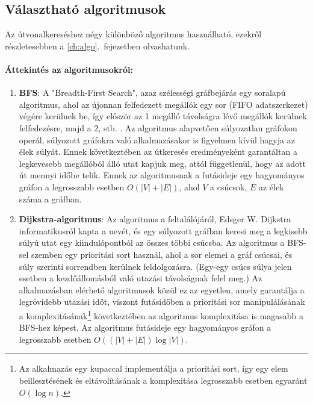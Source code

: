\subsection{Választható algoritmusok}

Az útvonalkereséshez négy különböző algoritmus használható, ezekről részletesebben a \ref{ch:algo}.~fejezetben olvashatunk.

\paragraph{Áttekintés az algoritmusokról:}
\begin{enumerate}
	\item \textbf{BFS}: A "Breadth-First Search", azaz szélességi gráfbejárás egy soralapú algoritmus, ahol az újonnan felfedezett megállók egy sor (FIFO adatszerkezet) végére kerülnek be, így először az 1 megálló távolságra lévő megállók kerülnek felfedezésre, majd a 2, stb. . Az algoritmus alapvetően súlyozatlan gráfokon operál, súlyozott gráfokra való alkalmazásakor is figyelmen kívül hagyja az élek súlyát. Ennek következtében az útkeresés eredményeként garantáltan a legkevesebb megállóból álló utat kapjuk meg, attól függetlenül, hogy az adott út mennyi időbe telik. Ennek az algoritmusnak a futásideje egy hagyományos gráfon a legrosszabb esetben $O(|V| + |E|)$, ahol $V$ a csúcsok, $E$ az élek száma a gráfban.
	\item \textbf{Dijkstra-algoritmus}: Az algoritmus a feltalálójáról, Edsger W. Dijkstra informatikusról kapta a nevét, és egy súlyozott gráfban keresi meg a legkisebb súlyú utat egy kiindulópontból az összes többi csúcsba. Az algoritmus a BFS-sel szemben egy prioritási sort használ, ahol a sor elemei a gráf csúcsai, és súly szerinti sorrendben kerülnek feldolgozásra. (Egy-egy csúcs súlya jelen esetben a kezdőállomásból való utazási távolságnak felel meg.) Az alkalmazásban elérhető algoritmusok közül ez az egyetlen, amely garantálja a legrövidebb utazási időt, viszont futásidőben a prioritási sor manipulálásának a komplexitásának\footnote{Az alkalmazás egy kupaccal implementálja a prioritási sort, így egy elem beillesztésének és eltávolításának a komplexitása legrosszabb esetben egyaránt $O(\log n)$.} következtében az algoritmus komplexitása is magasabb a BFS-hez képest. Az algoritmus futásideje egy hagyományos gráfon a legrosszabb esetben $O((|V| + |E|) \log |V|)$.

\end{enumerate}
